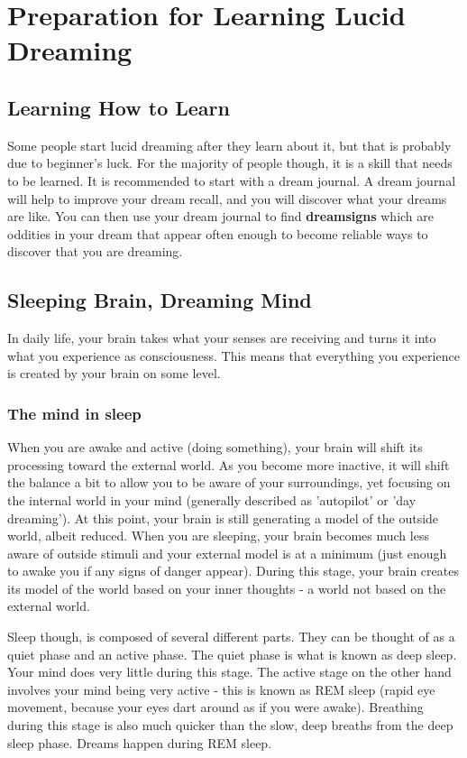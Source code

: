 \documentclass{book}
\begin{document}
\chapter{Preparation for Learning Lucid Dreaming}
\section{Learning How to Learn}
Some people start lucid dreaming after they learn about it, but that is probably due to beginner's luck. For the majority of people though, it is a skill that needs to be learned. It is recommended to start with a dream journal. A dream journal will help to improve your dream recall, and you will discover what your dreams are like. You can then use your dream journal to find \textbf{dreamsigns} which are oddities in your dream that appear often enough to become reliable ways to discover that you are dreaming.

\section{Sleeping Brain, Dreaming Mind}
In daily life, your brain takes what your senses are receiving and turns it into what you experience as consciousness. This means that everything you experience is created by your brain on some level.

\subsection{The mind in sleep}
When you are awake and active (doing something), your brain will shift its processing toward the external world. As you become more inactive, it will shift the balance a bit to allow you to be aware of your surroundings, yet focusing on the internal world in your mind (generally described as 'autopilot' or 'day dreaming'). At this point, your brain is still generating a model of the outside world, albeit reduced. When you are sleeping, your brain becomes much less aware of outside stimuli and your external model is at a minimum (just enough to awake you if any signs of danger appear). During this stage, your brain creates its model of the world based on your inner thoughts - a world not based on the external world.

Sleep though, is composed of several different parts. They can be thought of as a quiet phase and an active phase. The quiet phase is what is known as deep sleep. Your mind does very little during this stage. The active stage on the other hand involves your mind being very active - this is known as REM sleep (rapid eye movement, because your eyes dart around as if you were awake). Breathing during this stage is also much quicker than the slow, deep breaths from the deep sleep phase. Dreams happen during REM sleep.
\end{document}
